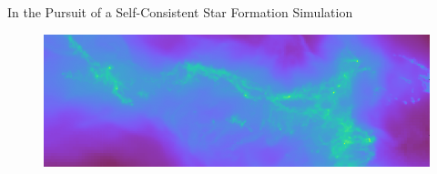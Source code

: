 \documentclass[aspectratio=169]{beamer}
\begin{document}
%
%
%

\section{~}
\begin{frame}{In the Pursuit of a Self-Consistent Star Formation Simulation}
\begin{figure}[h!]
	      \centering
	      \includegraphics[width=0.9\linewidth]{../images/research_test.png} 
	\end{figure}
\end{frame}
%
%
%
%
% 
\end{document}
